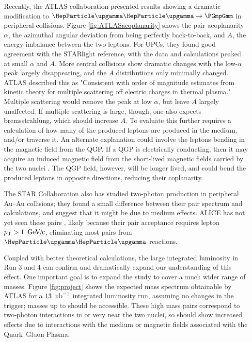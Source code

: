 \documentclass[../report.tex]{subfiles}
\begin{document}
Recently, the ATLAS collaboration \cite{Aaboud:2018eph} presented results showing a dramatic modification to $\PGg\PGg\rightarrow\PGmpGmm$ in peripheral collisions.  Figure \ref{fig:ATLASacoplanarity} shows the pair acoplanarity $\alpha$, the azimuthal angular deviation from being perfectly back-to-back, and $A$, the energy imbalance between the two leptons.  For UPCs, they found good agreement with the STARlight \cite{Baltz:2009jk,Klein:2016yzr} reference, with the data and calculations peaked at small $\alpha$ and $A$.   More central collisions show dramatic changes with the low-$\alpha$ peak largely disappearing, and the $A$ distributions only minimally changed.  ATLAS described this as "Consistent with order of magnitude estimates from kinetic theory for multiple scattering off electric charges in thermal plasma."  Multiple scattering would remove the peak at low $\alpha$, but leave $A$ largely unaffected.  If multiple scattering is large, though, one also expects bremsstrahlung, which should increase $A$.   To evaluate this further requires a calculation of how many of the produced leptons are produced in the medium, and/or traverse it.  An alternate explanation could involve the leptons bending in the magnetic field from the QGP.  If a QGP is electrically conducting, then it may acquire an induced magnetic field from the short-lived magnetic fields carried by the two nuclei \cite{Kharzeev:2012ph}.  The QGP field, however, will be longer lived, and could bend the produced leptons in opposite directions, reducing their coplanarity.

The STAR Collaboration also has studied two-photon \Pepem production in peripheral Au--Au collisions; they found a small difference between their pair  \pT{} spectrum and calculations, and suggest that it might be due to medium effects\cite{Adam:2018tdm}. ALICE has not yet seen these pairs \cite{Adam:2015gba}, likely because their pair acceptance requires  lepton $\pT > \unit[1]{\UGeVc}$, eliminating most pairs from $\PGg\PGg$ reactions. 

Coupled with better theoretical calculations, the large \PbPb{} integrated luminosity in Run 3 and 4 can confirm and dramatically expand our understanding of this effect.   One important goal is to expand the study to cover a much wider range of masses.  Figure \ref{fig:project} shows the expected mass spectrum obtainable by ATLAS for a $\unit[13]{\Unb^{-1}}$ integrated luminosity run, assuming no changes in the trigger; masses up to \unit[100]{\UGeVcc} should be accessible. These high mass pairs correspond to two-photon interactions in or very near the two nuclei, so should show increased effects due to interactions with the medium or magnetic fields associated with the Quark--Gluon Plasma. 
\end{document}

